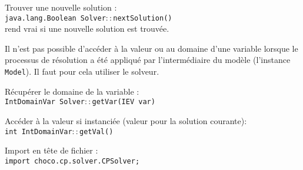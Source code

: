 Trouver une nouvelle solution :\\
\texttt{java.lang.Boolean Solver$\colon\colon$nextSolution()}\\
\indent rend vrai si une nouvelle solution est trouvée.

Il n'est pas possible d'accéder à la valeur ou au domaine d'une variable
lorsque le processus de résolution a été appliqué par l'intermédiaire du
modèle (l'instance \texttt{Model}). Il faut pour cela utiliser le solveur.

Récupérer le domaine de la variable :\\
\texttt{IntDomainVar Solver$\colon\colon$getVar(IEV var)}

Accéder à la valeur si instanciée (valeur pour la solution courante):\\
\texttt{int IntDomainVar$\colon\colon$getVal()}

Import en tête de fichier :\\
\texttt{import choco.cp.solver.CPSolver;}
